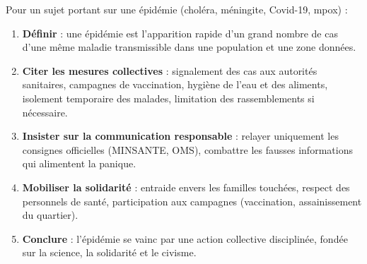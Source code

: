 \documentclass[11pt]{article}
\newcommand{\cle}[1]{{\popxbold\color{popdark}#1}}
\begin{document}
\begin{methode}
Pour un sujet portant sur une épidémie (choléra, méningite, Covid-19, mpox) :
\begin{enumerate}
\item \textbf{Définir} : une \cle{épidémie} est l'apparition rapide d'un grand nombre de cas d'une même maladie transmissible dans une population et une zone données.
\item \textbf{Citer les mesures collectives} : signalement des cas aux autorités sanitaires, campagnes de vaccination, hygiène de l'eau et des aliments, isolement temporaire des malades, limitation des rassemblements si nécessaire.
\item \textbf{Insister sur la communication responsable} : relayer uniquement les consignes officielles (MINSANTE, OMS), combattre les fausses informations qui alimentent la panique.
\item \textbf{Mobiliser la solidarité} : entraide envers les familles touchées, respect des personnels de santé, participation aux campagnes (vaccination, assainissement du quartier).
\item \textbf{Conclure} : l'épidémie se vainc par une \cle{action collective disciplinée}, fondée sur la science, la solidarité et le civisme.
\end{enumerate}
\end{methode}
\end{document}
